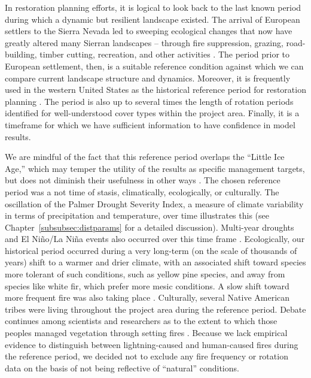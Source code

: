 In restoration planning efforts, it is logical to look back to the last known period during which a dynamic but resilient landscape existed. The arrival of European settlers to the Sierra Nevada led to sweeping ecological changes that now have greatly altered many Sierran landscapes -- through fire suppression, grazing, road-building, timber cutting, recreation, and other activities \citep{Storer1963,Stephens2015,Knapp2013,Hessburg2005}.  The period prior to European settlement, then, is a suitable reference condition against which we can compare current landscape structure and dynamics. Moreover, it is frequently used in the western United States as the historical reference period for restoration planning \citep{VandeWater2011,Safford2013,Meyer2013}. The period is also up to several times the length of rotation periods identified for well-understood cover types within the project area. Finally, it is a timeframe for which we have sufficient information to have confidence in model results. 

We are mindful of the fact that this reference period overlaps the ``Little Ice Age,'' which may temper the utility of the results as specific management targets, but does not diminish their usefulness in other ways \citep{Minnich2007,Safford2013}. The chosen reference period was a not time of stasis, climatically, ecologically, or culturally. The oscillation of the Palmer Drought Severity Index, a measure of climate variability in terms of precipitation and temperature, over time illustrates this (see Chapter~\ref{subsubsec:distparams} for a detailed discussion). Multi-year droughts and El Ni\~no/La Ni\~na events also occurred over this time frame \citep{Minnich2007}. Ecologically, our historical period occurred during a very long-term (on the scale of thousands of years) shift to a warmer and drier climate, with an associated shift toward species more tolerant of such conditions, such as yellow pine species, and away from species like white fir, which prefer more mesic conditions. A slow shift toward more frequent fire was also taking place \citep{Safford2013}. Culturally, several Native American tribes were living throughout the project area during the reference period. Debate continues among scientists and researchers as to the extent to which those peoples managed vegetation through setting fires \citep{Anderson1996}. Because we lack empirical evidence to distinguish between lightning-caused and human-caused fires during the reference period, we decided not to exclude any fire frequency or rotation data on the basis of not being reflective of ``natural'' conditions. 

